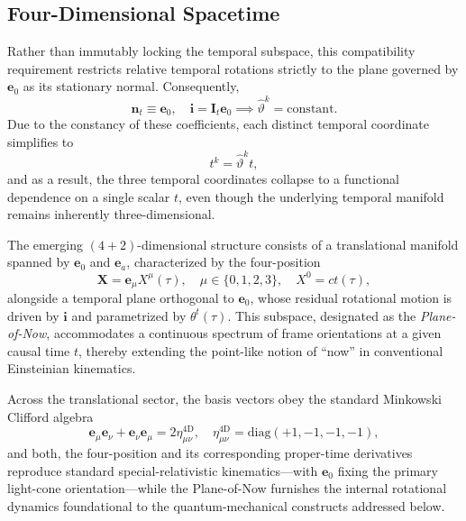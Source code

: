 \subsection{Four-Dimensional Spacetime}
\label{ch_causality_preservation}
Rather than immutably locking the temporal subspace, this compatibility requirement restricts relative temporal rotations strictly to the plane governed by $\mathbf{e}_{0}$ as its stationary normal. Consequently,
\begin{equation}\label{eq_pon_normal_fixed}
    \mathbf{n}_{t}\equiv\mathbf{e}_{0},\quad \mathbf{i}=\mathbf{I}_{t}\mathbf{e}_{0} \implies \hat{\vartheta}^{k} =\mathrm{constant}.
\end{equation}
Due to the constancy of these coefficients, each distinct temporal coordinate simplifies to
\begin{equation}
    t^{k}=\hat{\vartheta}^{k}t,
\end{equation}
and as a result, the three temporal coordinates collapse to a functional dependence on a single scalar $t$, even though the underlying temporal manifold remains inherently three-dimensional.

The emerging $(4+2)$-dimensional structure consists of a translational manifold spanned by $\mathbf{e}_{0}$ and $\mathbf{e}_{a}$, characterized by the four-position
\begin{equation}
    \mathbf{X}=\mathbf{e}_{\mu}X^{\mu}(\tau),\quad \mu\in\{0,1,2,3\},\quad X^{0}=ct(\tau),
\end{equation}
alongside a temporal plane orthogonal to $\mathbf{e}_{0}$, whose residual rotational motion is driven by $\mathbf{i}$ and parametrized by $\theta^{t}(\tau)$. This subspace, designated as the \emph{Plane-of-Now}, accommodates a continuous spectrum of frame orientations at a given causal time $t$, thereby extending the point-like notion of ``now'' in conventional Einsteinian kinematics.

Across the translational sector, the basis vectors obey the standard Minkowski Clifford algebra
\begin{equation}\label{eq_minkowski_metric}
    \mathbf{e}_{\mu}\mathbf{e}_{\nu}+\mathbf{e}_{\nu}\mathbf{e}_{\mu}=2\eta_{\mu\nu}^{\mathrm{4D}},\quad \eta_{\mu\nu}^{\mathrm{4D}}=\mathrm{diag}(+1,-1,-1,-1),
\end{equation}
and both, the four-position and its corresponding proper-time derivatives reproduce standard special-relativistic kinematics—with $\mathbf{e}_{0}$ fixing the primary light-cone orientation—while the Plane-of-Now furnishes the internal rotational dynamics foundational to the quantum-mechanical constructs addressed below.

